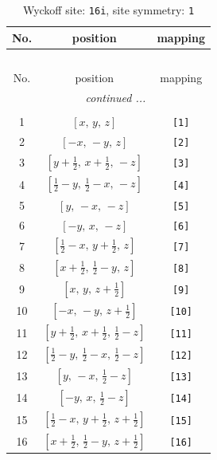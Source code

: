 \documentclass[fleqn,8pt]{jsarticle}
\begin{document}
\begin{longtable}{ccc}
\caption{Wyckoff site: {\tt 16i}, site symmetry: {\tt 1}}
 \\
 \hline \hline
No. & position & mapping \\ \hline \endfirsthead

\multicolumn{2}{l}{\tablename\ \thetable{}} \\
 \hline \hline
No. & position & mapping \\ \hline \endhead

 \hline \hline
\multicolumn{2}{r}{\footnotesize\it continued ...} \\ \endfoot

 \hline \hline
\multicolumn{2}{r}{} \\ \endlastfoot

1 & $\left[ x,\, y,\, z \right]$ & {\tt [1]} \\ \hline
2 & $\left[ - x,\, - y,\, z \right]$ & {\tt [2]} \\ \hline
3 & $\left[ y + \frac{1}{2},\, x + \frac{1}{2},\, - z \right]$ & {\tt [3]} \\ \hline
4 & $\left[ \frac{1}{2} - y,\, \frac{1}{2} - x,\, - z \right]$ & {\tt [4]} \\ \hline
5 & $\left[ y,\, - x,\, - z \right]$ & {\tt [5]} \\ \hline
6 & $\left[ - y,\, x,\, - z \right]$ & {\tt [6]} \\ \hline
7 & $\left[ \frac{1}{2} - x,\, y + \frac{1}{2},\, z \right]$ & {\tt [7]} \\ \hline
8 & $\left[ x + \frac{1}{2},\, \frac{1}{2} - y,\, z \right]$ & {\tt [8]} \\ \hline
9 & $\left[ x,\, y,\, z + \frac{1}{2} \right]$ & {\tt [9]} \\ \hline
10 & $\left[ - x,\, - y,\, z + \frac{1}{2} \right]$ & {\tt [10]} \\ \hline
11 & $\left[ y + \frac{1}{2},\, x + \frac{1}{2},\, \frac{1}{2} - z \right]$ & {\tt [11]} \\ \hline
12 & $\left[ \frac{1}{2} - y,\, \frac{1}{2} - x,\, \frac{1}{2} - z \right]$ & {\tt [12]} \\ \hline
13 & $\left[ y,\, - x,\, \frac{1}{2} - z \right]$ & {\tt [13]} \\ \hline
14 & $\left[ - y,\, x,\, \frac{1}{2} - z \right]$ & {\tt [14]} \\ \hline
15 & $\left[ \frac{1}{2} - x,\, y + \frac{1}{2},\, z + \frac{1}{2} \right]$ & {\tt [15]} \\ \hline
16 & $\left[ x + \frac{1}{2},\, \frac{1}{2} - y,\, z + \frac{1}{2} \right]$ & {\tt [16]} \\
\end{longtable}
\end{document}
